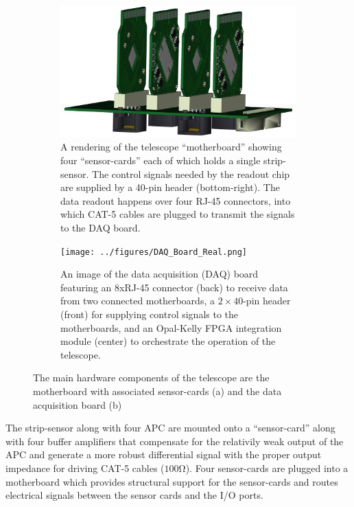 \documentclass{PoS}
\begin{document}
\begin{figure}[h]
  \centering
  \begin{subfigure}[t]{0.45\textwidth}
    \includegraphics[width=\textwidth]{../figures/Half-Telescope-Full.png}
    \caption{\scriptsize A rendering of the telescope ``motherboard'' showing four
      ``sensor-cards'' each of which holds a single strip-sensor. The control
      signals needed by the readout chip are supplied by a 40-pin header
      (bottom-right). The data readout happens over four RJ-45 connectors, into
      which CAT-5 cables are plugged to transmit the signals to the DAQ board.}
  \end{subfigure}
  \hspace{.3in}
  \begin{subfigure}[t]{0.45\textwidth}
    \texttt{[image: ../figures/DAQ\_Board\_Real.png]}
    \caption{\scriptsize An image of the data acquisition (DAQ) board featuring an 8xRJ-45
      connector (back) to receive data from two connected motherboards, a
      $2\times40$-pin header (front) for supplying control signals to the
      motherboards, and an Opal-Kelly FPGA integration module (center) to
      orchestrate the operation of the telescope.}
  \end{subfigure}
  \caption{The main hardware components of the telescope are the motherboard with associated sensor-cards (a) and the data acquisition board (b)}
\end{figure}

The strip-sensor along with four APC are mounted onto a ``sensor-card'' along
with four buffer amplifiers that compensate for the relativily weak output of
the APC and generate a more robust differential signal with the proper output
impedance for driving CAT-5 cables ($100\si{\ohm}$). Four sensor-cards are
plugged into a motherboard which provides structural support for the
sensor-cards and routes electrical signals between the sensor cards and the I/O
ports.
\end{document}
